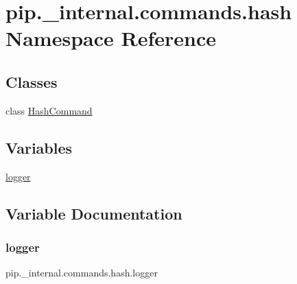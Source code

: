 \hypertarget{namespacepip_1_1__internal_1_1commands_1_1hash}{}\section{pip.\+\_\+internal.\+commands.\+hash Namespace Reference}
\label{namespacepip_1_1__internal_1_1commands_1_1hash}
\subsection*{Classes}
\begin{DoxyCompactItemize}
\item 
class \hyperlink{classpip_1_1__internal_1_1commands_1_1hash_1_1HashCommand}{Hash\+Command}
\end{DoxyCompactItemize}
\subsection*{Variables}
\begin{DoxyCompactItemize}
\item 
\hyperlink{namespacepip_1_1__internal_1_1commands_1_1hash_a4f68e6b25f1cf1757758281d83056b0f}{logger}
\end{DoxyCompactItemize}


\subsection{Variable Documentation}
\mbox{\label{namespacepip_1_1__internal_1_1commands_1_1hash_a4f68e6b25f1cf1757758281d83056b0f}} 
\subsubsection{\texorpdfstring{logger}{logger}}
{\footnotesize\ttfamily pip.\+\_\+internal.\+commands.\+hash.\+logger}


